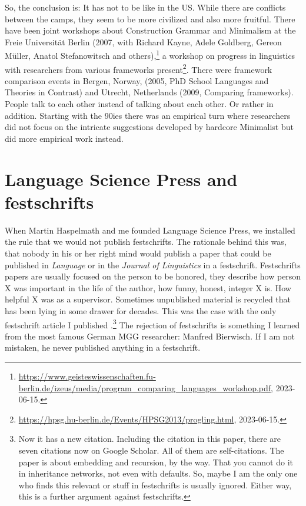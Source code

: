 \documentclass[output=paper,colorlinks,citecolor=brown]{langscibook}
\begin{document}
So, the conclusion is: It has not to be like in the US. While there are conflicts between the camps,
they seem to be more civilized and also more fruitful. There have been joint workshops about
Construction Grammar and Minimalism at the Freie Universität Berlin (2007, with Richard Kayne, Adele
Goldberg, Gereon Müller, Anatol Stefanowitsch and others),\footnote{
\url{https://www.geisteswissenschaften.fu-berlin.de/izeus/media/program_comparing_languages_workshop.pdf},
2023-06-15.
} a workshop on progress
in linguistics with researchers from various frameworks present\footnote{
\url{https://hpsg.hu-berlin.de/Events/HPSG2013/progling.html}, 2023-06-15.
}. There were framework comparison
events in Bergen, Norway, (2005, PhD School Languages and Theories in Contrast) and Utrecht,
Netherlands (2009, Comparing frameworks). People talk to each
other instead of talking about each other. Or rather in addition. Starting with the 90ies there was an empirical
turn where researchers did not focus on the intricate suggestions developed by hardcore Minimalist
but did more empirical work instead.


\section{Language Science Press and festschrifts}

When Martin Haspelmath and me founded Language Science Press, we installed the rule that we would
not publish festschrifts. The rationale behind this was, that nobody in his or her right mind would
publish a paper that could be published in \emph{Language} or in the \emph{Journal of Linguistics} in a
festschrift. Festschrifts papers are usually focused on the person to be honored, they describe how
person X was important in the life of the author, how funny, honest, integer X is. How helpful X was
as a supervisor. Sometimes
unpublished material is recycled that has been lying in some drawer for decades. This was the case
with the only festschrift article I published \citep{MuellerDefaults}.\footnote{
  Now it has a new citation. Including the citation in this paper, there are seven citations now on
  Google Scholar. All of them are self-citations. The paper is about embedding and recursion, by the way. That you
  cannot do it in inheritance networks, not even with defaults. So, maybe I am the only one who
  finds this relevant or stuff in festschrifts is usually ignored. Either way, this is a further
  argument against festschrifts.
}
The rejection of festschrifts is something I learned from the most famous German MGG researcher:
Manfred Bierwisch. If I am not mistaken, he never published anything in a festschrift.
\end{document}
